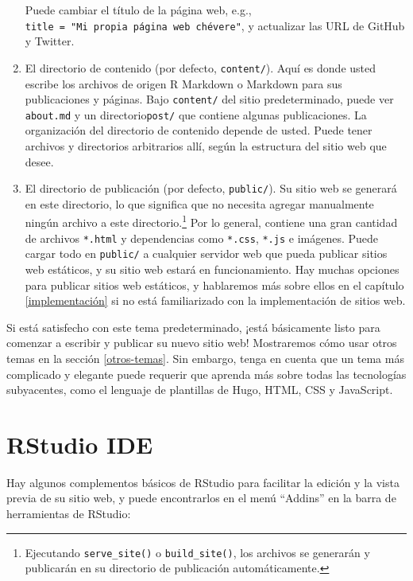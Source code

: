 \documentclass[12pt,]{krantz}
\theoremstyle{definition}
\theoremstyle{definition}
\theoremstyle{definition}
\theoremstyle{remark}
\begin{document}
\begin{enumerate}
  Puede cambiar el título de la página web, e.g.,
  \texttt{title\ =\ "Mi\ propia\ página\ web\ chévere"}, y actualizar
  las URL de GitHub y Twitter.
\item
  El directorio de contenido (por defecto, \texttt{content/}). Aquí es
  donde usted escribe los archivos de origen R Markdown o Markdown para
  sus publicaciones y páginas. Bajo \texttt{content/} del sitio
  predeterminado, puede ver \texttt{about.md} y un
  directorio\texttt{post/} que contiene algunas publicaciones. La
  organización del directorio de contenido depende de usted. Puede tener
  archivos y directorios arbitrarios allí, según la estructura del sitio
  web que desee.
\item
  El directorio de publicación (por defecto, \texttt{public/}). Su sitio
  web se generará en este directorio, lo que significa que no necesita
  agregar manualmente ningún archivo a este directorio.\footnote{Ejecutando
    \texttt{serve\_site()} o \texttt{build\_site()}, los archivos se
    generarán y publicarán en su directorio de publicación
    automáticamente.} Por lo general, contiene una gran cantidad de
  archivos \texttt{*.html} y dependencias como \texttt{*.css},
  \texttt{*.js} e imágenes. Puede cargar todo en \texttt{public/} a
  cualquier servidor web que pueda publicar sitios web estáticos, y su
  sitio web estará en funcionamiento. Hay muchas opciones para publicar
  sitios web estáticos, y hablaremos más sobre ellos en el capítulo
  \ref{implementación} si no está familiarizado con la implementación de
  sitios web.
\end{enumerate}

Si está satisfecho con este tema predeterminado, ¡está básicamente listo
para comenzar a escribir y publicar su nuevo sitio web! Mostraremos cómo
usar otros temas en la sección \ref{otros-temas}. Sin embargo, tenga en
cuenta que un tema más complicado y elegante puede requerir que aprenda
más sobre todas las tecnologías subyacentes, como el lenguaje de
plantillas de Hugo, HTML, CSS y JavaScript.

\hypertarget{rstudio-ide}{%
\section{RStudio IDE}\label{rstudio-ide}}

Hay algunos complementos básicos de
RStudio para facilitar la edición y la
vista previa de su sitio web, y puede encontrarlos en el menú ``Addins''
en la barra de herramientas de RStudio:
\end{document}
